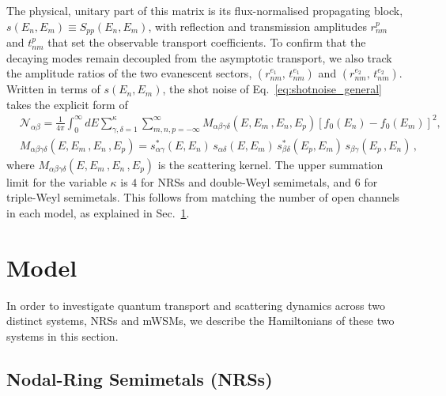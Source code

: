 \documentclass[aps,prb,onecolumn,longbibliography,nofootinbib,citeautoscript,10pt]{revtex4-2}
\def \nn{\nonumber \\}
\def\nn{\nonumber \\}
\def \nn{\nonumber \\}
\begin{document}
The physical, unitary part of this matrix is its flux-normalised propagating block, $s(E_n, E_m) \equiv S_{pp}(E_n, E_m)$, with reflection and transmission amplitudes $r_{nm}^{p}$ and $t_{nm}^{p}$ that set the observable transport coefficients. To confirm that the decaying modes remain decoupled from the asymptotic transport, we also track the amplitude ratios of the two evanescent sectors, $(r_{nm}^{e_1} , \,  t_{nm}^{e_1})$ and $(r_{nm}^{e_2} ,\,  t_{nm}^{e_2})$. Written in terms of $s(E_n,E_m)$, the shot noise of Eq.~\eqref{eq:shotnoise_general} takes the explicit form of
\begin{align}
&	\mathcal{N}_{\alpha \beta} = \frac{1} {4\pi} 
\int_{0}^{\infty} dE \sum_{\gamma,\delta=1}^{\kappa} \sum \limits_{m,n,p=-\infty}^{\infty} 
M_{\alpha \beta \gamma \delta}(E,E_m \,, E_n , E_{p}) \left[ f_{0}(E_{n}) - f_{0}(E_m) \right ]^2, \nn &
M_{\alpha \beta \gamma \delta}(E,E_m \,, E_n \,, E_p) 
= s^*_{\alpha \gamma}(E,E_n) \,s_{\alpha \delta}(E,E_m) \,s^*_{\beta \delta}(E_p, 
E_m) \,s_{\beta \gamma}(E_p\,, E_n) \,,
\label{eq:shotnoise3d}
\end{align}
where $ M_{\alpha \beta \gamma \delta}(E,E_m \,, E_n \,, E_p) $ is the scattering kernel. The upper summation limit for the variable $\kappa$ is $4$ for NRSs and double-Weyl semimetals, and $ 6$ for triple-Weyl semimetals. This follows from matching the number of open channels in each model, as explained in Sec.~\ref{sec:model_hamiltonian}.


\section{Model}
\label{sec:model_hamiltonian}

In order to investigate quantum transport and scattering dynamics across two distinct systems, NRSs and mWSMs, we describe the Hamiltonians of these two systems in this section.

\subsection{Nodal-Ring Semimetals (NRSs)}
\label{subsec:nodal_line}
\end{document}
